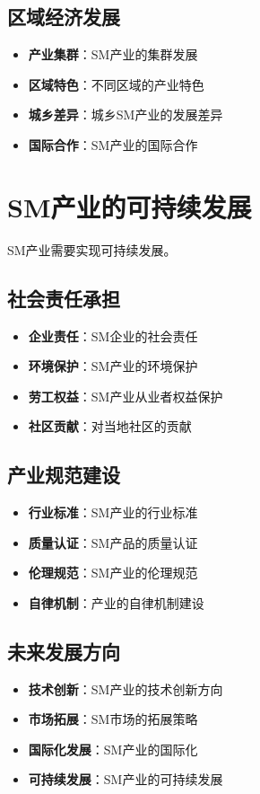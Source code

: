 \documentclass[12pt,UTF8]{ctexbook}
\begin{document}
\subsection{区域经济发展}
\begin{itemize}[leftmargin=2cm]
	\item \textbf{产业集群}：SM产业的集群发展
	\item \textbf{区域特色}：不同区域的产业特色
	\item \textbf{城乡差异}：城乡SM产业的发展差异
	\item \textbf{国际合作}：SM产业的国际合作
\end{itemize}

\section{SM产业的可持续发展}
SM产业需要实现可持续发展。

\subsection{社会责任承担}
\begin{itemize}[leftmargin=2cm]
	\item \textbf{企业责任}：SM企业的社会责任
	\item \textbf{环境保护}：SM产业的环境保护
	\item \textbf{劳工权益}：SM产业从业者权益保护
	\item \textbf{社区贡献}：对当地社区的贡献
\end{itemize}

\subsection{产业规范建设}
\begin{itemize}[leftmargin=2cm]
	\item \textbf{行业标准}：SM产业的行业标准
	\item \textbf{质量认证}：SM产品的质量认证
	\item \textbf{伦理规范}：SM产业的伦理规范
	\item \textbf{自律机制}：产业的自律机制建设
\end{itemize}

\subsection{未来发展方向}
\begin{itemize}[leftmargin=2cm]
	\item \textbf{技术创新}：SM产业的技术创新方向
	\item \textbf{市场拓展}：SM市场的拓展策略
	\item \textbf{国际化发展}：SM产业的国际化
	\item \textbf{可持续发展}：SM产业的可持续发展
\end{itemize}
\end{document}
